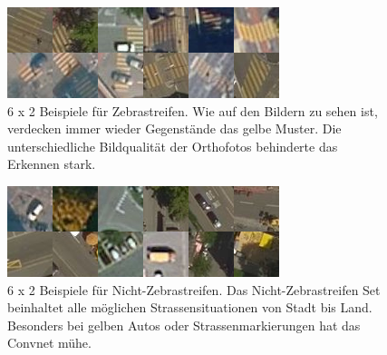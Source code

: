 \begin{figure}[H]
	\centering
	\includegraphics{images/Zebrastreifen_examples.png}
	\caption{6 x 2 Beispiele für Zebrastreifen. Wie auf den Bildern zu sehen ist, verdecken immer wieder Gegenstände das gelbe Muster. Die unterschiedliche Bildqualität der Orthofotos behinderte das Erkennen stark.}
\end{figure}

\begin{figure}[H]
	\centering
	\includegraphics{images/No_Zebrastreifen_examples.png}
	\caption{6 x 2 Beispiele für Nicht-Zebrastreifen. Das Nicht-Zebrastreifen Set beinhaltet alle möglichen Strassensituationen von Stadt bis Land. Besonders bei gelben Autos oder Strassenmarkierungen hat das Convnet mühe.}
\end{figure}
